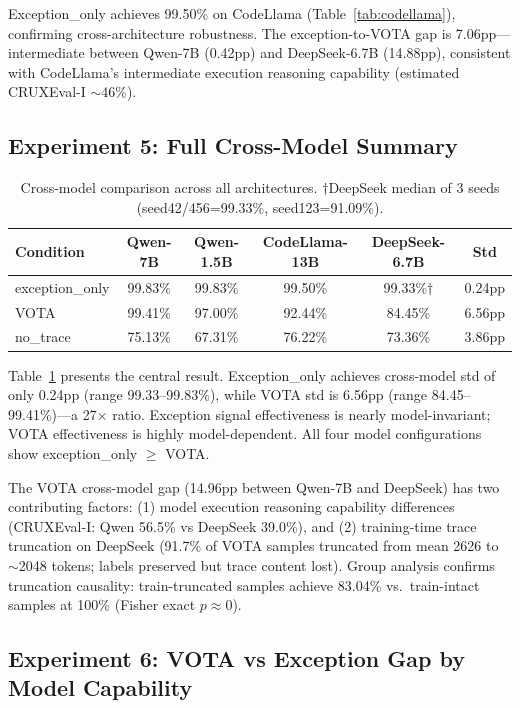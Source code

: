 \documentclass[11pt]{article}
\begin{document}
Exception\_only achieves 99.50\% on CodeLlama (Table~\ref{tab:codellama}), confirming cross-architecture robustness. The exception-to-VOTA gap is 7.06pp---intermediate between Qwen-7B (0.42pp) and DeepSeek-6.7B (14.88pp), consistent with CodeLlama's intermediate execution reasoning capability (estimated CRUXEval-I $\sim$46\%).

\subsection{Experiment 5: Full Cross-Model Summary}

\begin{table}[h]
\centering
\caption{Cross-model comparison across all architectures. $\dagger$DeepSeek median of 3 seeds (seed42/456=99.33\%, seed123=91.09\%).}
\label{tab:crossmodel}
\begin{tabular}{lccccc}
\toprule
Condition & Qwen-7B & Qwen-1.5B & CodeLlama-13B & DeepSeek-6.7B & Std \\
\midrule
exception\_only & 99.83\% & 99.83\% & 99.50\% & 99.33\%$\dagger$ & 0.24pp \\
VOTA & 99.41\% & 97.00\% & 92.44\% & 84.45\% & 6.56pp \\
no\_trace & 75.13\% & 67.31\% & 76.22\% & 73.36\% & 3.86pp \\
\bottomrule
\end{tabular}
\end{table}

Table~\ref{tab:crossmodel} presents the central result. Exception\_only achieves cross-model std of only 0.24pp (range 99.33--99.83\%), while VOTA std is 6.56pp (range 84.45--99.41\%)---a 27$\times$ ratio. Exception signal effectiveness is nearly model-invariant; VOTA effectiveness is highly model-dependent. All four model configurations show exception\_only $\geq$ VOTA.

The VOTA cross-model gap (14.96pp between Qwen-7B and DeepSeek) has two contributing factors: (1) model execution reasoning capability differences (CRUXEval-I: Qwen 56.5\% vs DeepSeek 39.0\%), and (2) training-time trace truncation on DeepSeek (91.7\% of VOTA samples truncated from mean 2626 to $\sim$2048 tokens; labels preserved but trace content lost). Group analysis confirms truncation causality: train-truncated samples achieve 83.04\% vs.\ train-intact samples at 100\% (Fisher exact $p \approx 0$).

\subsection{Experiment 6: VOTA vs Exception Gap by Model Capability}
\end{document}
